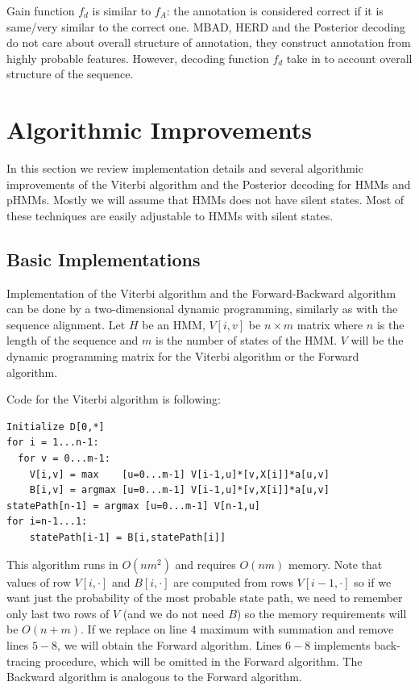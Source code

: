 Gain function $f_d$ is similar to $f_A$: the annotation is considered correct if
it is same/very similar to the correct one. MBAD, HERD and the
Posterior decoding do not care about overall structure of annotation, they
construct annotation from highly probable features. However,
decoding function $f_d$ take in to account
overall structure of the sequence.


\section{Algorithmic Improvements}
\label{SECTION:ALGORITHMICIMPROVEMENTS}

In this section we review implementation details and several algorithmic
improvements of the Viterbi algorithm and the Posterior decoding for HMMs and
pHMMs. Mostly we will assume that HMMs does not have silent states.  Most of these
techniques are easily adjustable to HMMs with silent states. 

\subsection{Basic Implementations}

Implementation of the Viterbi algorithm and the Forward-Backward algorithm can be
done by a two-dimensional dynamic programming, similarly as with the sequence
alignment. Let $H$ be an HMM, $V[i,v]$ be  $n\times m$ matrix where $n$ is the
length of the sequence and $m$ is the number of states of the HMM. $V$ will be the
dynamic programming matrix for the Viterbi algorithm or the Forward algorithm.

Code for the Viterbi algorithm is following:
\begin{lstlisting}
Initialize D[0,*]
for i = 1...n-1:
  for v = 0...m-1:
    V[i,v] = max    [u=0...m-1] V[i-1,u]*[v,X[i]]*a[u,v]
    B[i,v] = argmax [u=0...m-1] V[i-1,u]*[v,X[i]]*a[u,v]
statePath[n-1] = argmax [u=0...m-1] V[n-1,u]
for i=n-1...1:
    statePath[i-1] = B[i,statePath[i]]
\end{lstlisting}

This algorithm runs in $O(nm^2)$ and requires $O(nm)$ memory. Note that values
of row $V[i,\cdot]$ and $B[i,\cdot]$ are computed from rows $V[i-1,\cdot]$ so if
we want just the probability of the most probable state path, we need to
remember only last two rows of $V$ (and we do not need $B$) so the memory
requirements will be $O(n+m)$. If we replace on line $4$ maximum with summation
and remove lines $5-8$, we will obtain the Forward algorithm. Lines $6-8$
implements back-tracing procedure, which will be omitted in the Forward
algorithm. The Backward algorithm is analogous to the Forward algorithm.

